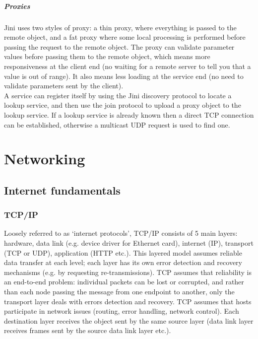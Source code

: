 \documentclass[a4paper,oneside]{report}
\begin{document}
      	 	\paragraph{Proxies}
      	 	Jini uses two styles of proxy: a thin proxy, where everything is passed to the remote object, and a fat proxy where some local processing is performed before passing the request to the remote object. The proxy can validate parameter values before passing them to the remote object, which means more responsiveness at the client end (no waiting for a remote server to tell you that a value is out of range). It also means less loading at the service end (no need to validate parameters sent by the client).\\
      	 	
      	 	A service can register itself by using the Jini discovery protocol to locate a lookup service, and then use the join protocol to upload a proxy object to the lookup service. If a lookup service is already known then a direct TCP connection can be established, otherwise a multicast UDP request is used to find one.
      	 	  		
\chapter{Networking}

	\section{Internet fundamentals}
 	
    	\subsection{TCP/IP}
    	Loosely referred to as `internet protocols', TCP/IP consists of 5 main layers: hardware, data link (e.g. device driver for Ethernet card), internet (IP), transport (TCP or UDP), application (HTTP etc.). This layered model assumes reliable data transfer at each level; each layer has its own error detection and recovery mechanisms (e.g. by requesting re-transmissions). TCP assumes that reliability is an end-to-end problem: individual packets can be lost or corrupted, and rather than each node passing the message from one endpoint to another, only the transport layer deals with errors detection and recovery. TCP assumes that hosts participate in network issues (routing, error handling, network control). Each destination layer receives the object sent by the same source layer (data link layer receives frames sent by the source data link layer etc.).
    	
\end{document}
